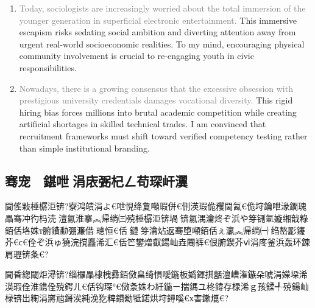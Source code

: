 ﻿\documentclass[lang=cn,11pt]{elegantbook}
\begin{document}
\begin{enumerate}
    \item \textcolor{gray}{Today, sociologists are increasingly worried about the total immersion of the younger generation in superficial electronic entertainment.} This immersive escapism risks sedating social ambition and diverting attention away from urgent real-world socioeconomic realities. To my mind, encouraging physical community involvement is crucial to re-engaging youth in civic responsibilities.
    \item \textcolor{gray}{Nowadays, there is a growing consensus that the excessive obsession with prestigious university credentials damages vocational diversity.} This rigid hiring bias forces millions into brutal academic competition while creating artificial shortages in skilled technical trades. I am convinced that recruitment frameworks must shift toward verified competency testing rather than simple institutional branding.
\end{enumerate}

\subsection{骞宠　鍖呭涓庡弻杞ㄥ苟琛屽瀷}

閫傜敤棰樼洰锛?寮鸿皟涓よ€呭悓绛夐噸瑕併€侀渶瑕佹矡閫氥€佹垨鑰呭湪鐗瑰畾骞冲彴杩涜澶氱淮搴︽帰绱㈢殑棰樼洰锛堝锛氱湡瀹炵ぞ浜や笌铏氭嫙缃戠粶銆佸垎姝т腑鐨勫弸濂借璁恒€佸鏈笌瀹炶返骞堕噸銆佸ぇ瀛︽帰绱㈠绉嶅彲鑳芥€с€佺ぞ浜ゅ獟浣撹矗浠汇€佸笀鐢熷叡鍚屾垚闀裤€佷腑鍥芥ⅵ涓庝釜浜轰环鍊肩瓑锛夈€?

閫昏緫閾炬潯锛?缁欏畾棣栧彞銆傚畠绮惧噯鍦板嬀鍕掑嚭澶嶆潅鏃朵唬涓嬫垜浠渶瑕佺淮鎸佺殑鍔ㄦ€佸钩琛°€傚洜姝わ紝鍦ㄧ揣鎷ユ柊鍏存椂浠ｇ孩鍒╃殑鍚屾椂锛岀粷涓嶈兘鎶涘純浼犵粺鐨勬牴鍩烘垨鐞嗘€х害鏉熴€?
\end{document}
